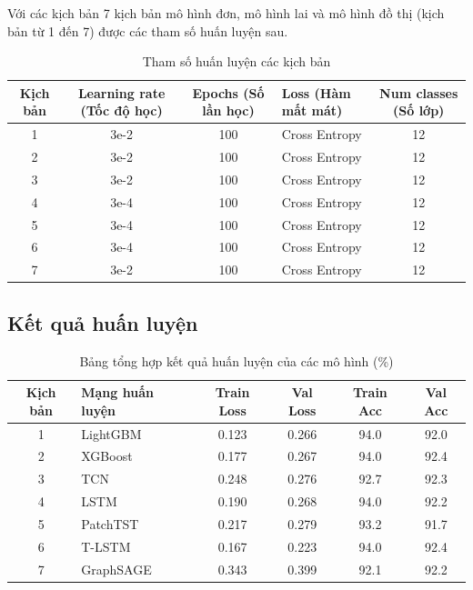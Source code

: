 \documentclass[10pt,twoside]{article}
\begin{document}
Với các kịch bản 7 kịch bản mô hình đơn, mô hình lai và mô hình đồ thị (kịch bản từ 1 đến 7) được các tham số huấn luyện sau.
\begin{table}[H] 
\centering 
\caption{Tham số huấn luyện các kịch bản} 
\label{tab:hyperparameter} 
\begin{tabular}{c c c l c} 
\hline 
\textbf{Kịch bản} & \textbf{Learning rate (Tốc độ học)} & \textbf{Epochs (Số lần học)} & \textbf{Loss (Hàm mất mát)} & \textbf{Num classes (Số lớp)} \\ 
\hline 
1 & 3e-2 & 100 & Cross Entropy & 12 \\ 
2 & 3e-2 & 100 & Cross Entropy & 12 \\ 
3 & 3e-2 & 100 & Cross Entropy & 12 \\ 
4 & 3e-4 & 100 & Cross Entropy & 12 \\ 
5 & 3e-4 & 100 & Cross Entropy & 12 \\ 
6 & 3e-4 & 100 & Cross Entropy & 12 \\ 
7 & 3e-2 & 100 & Cross Entropy & 12 \\ 
\hline 
\end{tabular} 
\end{table}
\subsection{Kết quả huấn luyện}

\begin{table}[H]
\centering
\caption{Bảng tổng hợp kết quả huấn luyện của các mô hình (\%)}
\label{tab:training_results}
\begin{tabular}{c l c c c c}
\hline
\textbf{Kịch bản} & \textbf{Mạng huấn luyện} & \textbf{Train Loss} & \textbf{Val Loss} & \textbf{Train Acc} & \textbf{Val Acc} \\
\hline
1 & LightGBM  & 0.123 & 0.266 & 94.0 & 92.0 \\
2 & XGBoost   & 0.177 & 0.267 & 94.0 & 92.4 \\
3 & TCN       & 0.248 & 0.276 & 92.7 & 92.3 \\
4 & LSTM      & 0.190 & 0.268 & 94.0 & 92.2 \\
5 & PatchTST  & 0.217 & 0.279 & 93.2 & 91.7 \\
6 & T-LSTM    & 0.167 & 0.223 & 94.0 & 92.4 \\
7 & GraphSAGE & 0.343 & 0.399 & 92.1 & 92.2 \\
\hline
\end{tabular}
\end{table}
\end{document}
